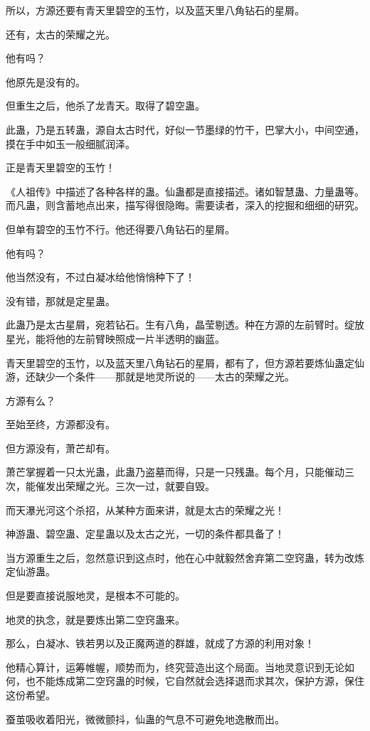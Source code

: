 \begin{this_body}
所以，方源还要有青天里碧空的玉竹，以及蓝天里八角钻石的星屑。

还有，太古的荣耀之光。

他有吗？

他原先是没有的。

但重生之后，他杀了龙青天。取得了碧空蛊。

此蛊，乃是五转蛊，源自太古时代，好似一节墨绿的竹干，巴掌大小，中间空通，摸在手中如玉一般细腻润泽。

正是青天里碧空的玉竹！

《人祖传》中描述了各种各样的蛊。仙蛊都是直接描述。诸如智慧蛊、力量蛊等。而凡蛊，则含蓄地点出来，描写得很隐晦。需要读者，深入的挖掘和细细的研究。

但单有碧空的玉竹不行。他还得要八角钻石的星屑。

他有吗？

他当然没有，不过白凝冰给他悄悄种下了！

没有错，那就是定星蛊。

此蛊乃是太古星屑，宛若钻石。生有八角，晶莹剔透。种在方源的左前臂时。绽放星光，能将他的左前臂映照成一片半透明的幽蓝。

青天里碧空的玉竹，以及蓝天里八角钻石的星屑，都有了，但方源若要炼仙蛊定仙游，还缺少一个条件——那就是地灵所说的——太古的荣耀之光。

方源有么？

至始至终，方源都没有。

但方源没有，萧芒却有。

萧芒掌握着一只太光蛊，此蛊乃盗墓而得，只是一只残蛊。每个月，只能催动三次，能催发出荣耀之光。三次一过，就要自毁。

而天瀑光河这个杀招，从某种方面来讲，就是太古的荣耀之光！

神游蛊、碧空蛊、定星蛊以及太古之光，一切的条件都具备了！

当方源重生之后，忽然意识到这点时，他在心中就毅然舍弃第二空窍蛊，转为改炼定仙游蛊。

但是要直接说服地灵，是根本不可能的。

地灵的执念，就是要炼出第二空窍蛊来。

那么，白凝冰、铁若男以及正魔两道的群雄，就成了方源的利用对象！

他精心算计，运筹帷幄，顺势而为，终究营造出这个局面。当地灵意识到无论如何，也不能炼成第二空窍蛊的时候，它自然就会选择退而求其次，保护方源，保住这份希望。

蚕茧吸收着阳光，微微颤抖，仙蛊的气息不可避免地逸散而出。


\end{this_body}
